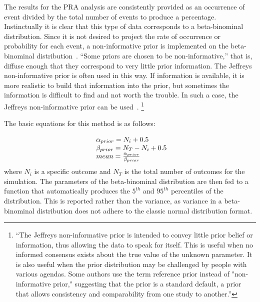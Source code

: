 The results for the PRA analysis are consistently provided as an occurrence of event 
divided by the total number of events to produce a percentage. Instinctually it is 
clear that this type of data corresponds to a beta-binominal distribution.  
Since it is not desired to project the rate of occurrence or probability for each event,
 a non-informative prior is implemented on the beta-binominal distribution~\cite{stat}.
``Some priors are chosen to be non-informative,'' that is, diffuse enough that they correspond 
to very little prior information. The Jeffreys non-informative prior is often used in this way. 
If information is available, it is more realistic to build that information into the prior, 
but sometimes the information is difficult to find and not worth the trouble. 
In such a case, the Jeffreys non-informative prior can be used~\cite{NUREGCR6823}.
\footnote{``The Jeffreys non-informative prior is intended to convey little prior belief or information, 
thus allowing the data to speak for itself. This is useful when no informed consensus exists 
about the true value of the unknown parameter. It is also useful when the prior distribution 
may be challenged by people with various agendas. Some authors use the term reference prior 
instead of "non-informative prior," suggesting that the prior is a standard default, a prior 
that allows consistency and comparability from one study to another.''}

The basic equations for this method is as follows:

\begin{equation}
  \begin{array}{l@{}l}
    \alpha_{prior} = N_i + 0.5                     \\
    \beta_{prior} = N_T - N_i + 0.5                \\
    mean = \frac{\alpha_{prior}}{\beta_{prior}}
  \label{eq:priorDef}
  \end{array}
\end{equation}
where $N_i$ is a specific outcome and $N_T$ is the total number of outcomes for the simulation. 
The parameters of the beta-binominal distribution are then fed to a function that automatically 
produces the $5^{th}$ and $95^{th}$ percentiles of the distribution.  This is reported rather than the 
variance, as variance in a beta-binominal distribution does not adhere to the classic normal 
distribution format.

